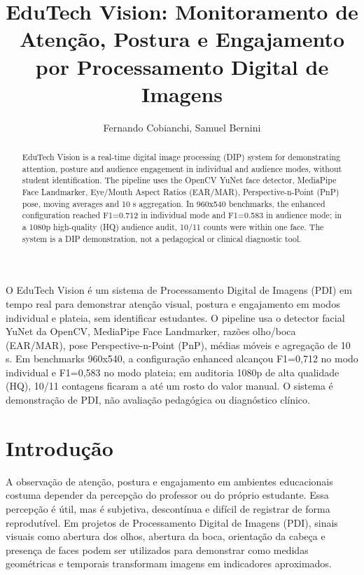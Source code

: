 \documentclass[12pt]{article}
\title{EduTech Vision: Monitoramento de Atenção, Postura e Engajamento por Processamento Digital de Imagens}
\author{Fernando Cobianchi, Samuel Bernini}
\begin{document}
\maketitle

\begin{abstract}
EduTech Vision is a real-time digital image processing (DIP) system for demonstrating attention, posture and audience engagement in individual and audience modes, without student identification. The pipeline uses the OpenCV YuNet face detector, MediaPipe Face Landmarker, Eye/Mouth Aspect Ratios (EAR/MAR), Perspective-n-Point (PnP) pose, moving averages and 10 s aggregation. In 960x540 benchmarks, the enhanced configuration reached F1=0.712 in individual mode and F1=0.583 in audience mode; in a 1080p high-quality (HQ) audience audit, 10/11 counts were within one face. The system is a DIP demonstration, not a pedagogical or clinical diagnostic tool.
\end{abstract}

\begin{resumo}
O EduTech Vision é um sistema de Processamento Digital de Imagens (PDI) em tempo real para demonstrar atenção visual, postura e engajamento em modos individual e plateia, sem identificar estudantes. O pipeline usa o detector facial YuNet da OpenCV, MediaPipe Face Landmarker, razões olho/boca (EAR/MAR), pose Perspective-n-Point (PnP), médias móveis e agregação de 10 s. Em benchmarks 960x540, a configuração enhanced alcançou F1=0,712 no modo individual e F1=0,583 no modo plateia; em auditoria 1080p de alta qualidade (HQ), 10/11 contagens ficaram a até um rosto do valor manual. O sistema é demonstração de PDI, não avaliação pedagógica ou diagnóstico clínico.
\end{resumo}

\section{Introdução}

A observação de atenção, postura e engajamento em ambientes educacionais costuma depender da percepção do professor ou do próprio estudante. Essa percepção é útil, mas é subjetiva, descontínua e difícil de registrar de forma reprodutível. Em projetos de Processamento Digital de Imagens (PDI), sinais visuais como abertura dos olhos, abertura da boca, orientação da cabeça e presença de faces podem ser utilizados para demonstrar como medidas geométricas e temporais transformam imagens em indicadores aproximados.
\end{document}
